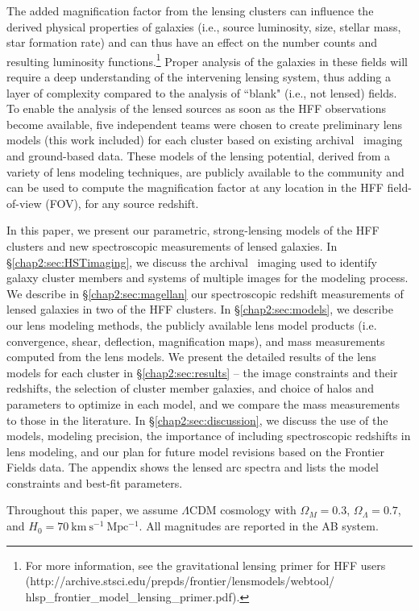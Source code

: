 The added magnification factor from the lensing clusters can influence the derived physical properties of galaxies (i.e., source luminosity, size, stellar mass, star formation rate) and can thus have an effect on the number counts and resulting luminosity functions.\footnote{For more information, see the gravitational lensing primer for HFF users (http://archive.stsci.edu/prepds/frontier/lensmodels/webtool/ hlsp\_frontier\_model\_lensing\_primer.pdf).} Proper analysis of the galaxies in these fields will require a deep understanding of the intervening lensing system, thus adding a layer of complexity compared to the analysis of ``blank" (i.e., not lensed) fields. To enable the analysis of the lensed sources as soon as the HFF observations become available, five independent teams were chosen to create preliminary lens models (this work included) for each cluster based on existing archival \hst\ imaging and ground-based data. These models of the lensing potential, derived from a variety of lens modeling techniques, are publicly available to the community and can be used to compute the magnification factor at any location in the HFF field-of-view (FOV), for any source redshift.

In this paper, we present our parametric, strong-lensing models of the HFF clusters and new spectroscopic measurements of lensed galaxies. In \S \ref{chap2:sec:HSTimaging}, we discuss the archival \hst\ imaging used to identify galaxy cluster members and systems of multiple images for the modeling process. We describe in \S \ref{chap2:sec:magellan} our spectroscopic redshift measurements of lensed galaxies in two of the HFF clusters. In \S \ref{chap2:sec:models}, we describe our lens modeling methods, the publicly available lens model products (i.e. convergence, shear, deflection, magnification maps), and mass measurements computed from the lens models. We present the detailed results of the lens models for each cluster in \S \ref{chap2:sec:results} -- the image constraints and their redshifts, the selection of cluster member galaxies, and choice of halos and parameters to optimize in each model, and we compare the mass measurements to those in the literature. In \S \ref{chap2:sec:discussion}, we discuss the use of the models, modeling precision, the importance of including spectroscopic redshifts in lens modeling, and our plan for future model revisions based on the Frontier Fields data. The appendix shows the lensed arc spectra and lists the model constraints and best-fit parameters.

Throughout this paper, we assume $\Lambda$CDM cosmology with $\Omega_M=0.3$, $\Omega_\Lambda=0.7$, and $H_0=70\ \mathrm{km\ s^{-1}\ Mpc^{-1}}$. All magnitudes are reported in the AB system.

